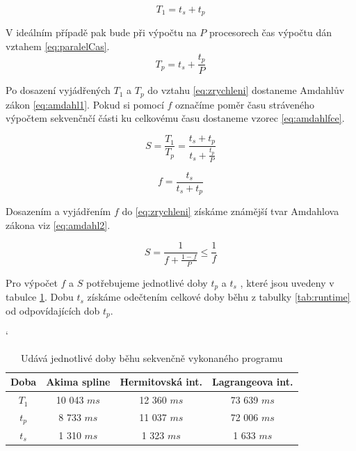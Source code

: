 \documentclass{article}
\begin{document}
	\begin{equation} 
	T_{1} = t_{s} + t_{p}   
	\label{eq:sekvencniSys}
	\end{equation}
	
	V ideálním případě pak bude při výpočtu na $P$ procesorech čas výpočtu dán vztahem \ref{eq:paralelCas}.
	\begin{equation} 
	T_{p} = t_{s} + \frac{t_{p}}{P}   
	\label{eq:paralelCas}
	\end{equation}
	
	Po dosazení vyjádřených $T_{1}$ a $T_{p}$ do vztahu \ref{eq:zrychleni} dostaneme Amdahlův zákon \ref{eq:amdahl1}. Pokud si pomocí $f$ označíme poměr času stráveného výpočtem sekvenčnčí části ku celkovému času dostaneme vzorec \ref{eq:amdahlfce}.
	
	\begin{equation} 
	S=\frac{T_{1}}{T_{p}} = \frac{t_{s} + t_{p} }{t_{s} + \frac{t_{p}}{P}}
	\label{eq:amdahl1}
	\end{equation}
	
	
	\begin{equation} 
	f = \frac{t_{s}}{t_{s} + t_{p}}
	\label{eq:amdahlfce}
	\end{equation}
	
	Dosazením a vyjádřením $f$ do \ref{eq:zrychleni} získáme známější tvar Amdahlova zákona viz \ref{eq:amdahl2}.
	
	\begin{equation} 
	S=\frac{1}{f + \frac{1-f}{P}} \leq  \frac{1}{f}
	\label{eq:amdahl2}
	\end{equation}
	
	Pro výpočet $f$ a $S$ potřebujeme jednotlivé doby $t_{p}$ a $t_{s}$ , které jsou uvedeny v tabulce \ref{tab:dobyBeh2}. Dobu $t_{s}$ získáme odečtením celkové doby běhu z tabulky \ref{tab:runtime} od odpovídajících dob $t_{p}$.
	
	
	\begin{table}[h]
	\centering
	\catcode`
	\def\arraystretch{1.2}
	\begin{tabular}{|c|c|c|c|}
	\hline
	\textbf{Doba}   & \textbf{Akima spline} & \textbf{Hermitovská int.} &  \textbf{Lagrangeova int.} \\ \hline
	\hline
	$T_{1}$    		  & 10 043 $m s$                  & 12 360 $m s$     		  &        73 639  $m s$                     \\ \hline
	$t_{p}$                  & 8 733 $m s$                  & 11 037 $m s$               &        72 006 $m s$                         \\ \hline
	$t_{s}$           		  & 1 310 $m s$                  & 1 323 $m s$                       & 1 633   $m s$          \\ \hline
	\end{tabular}
	\caption{Udává jednotlivé doby běhu sekvenčně vykonaného programu}
	\label{tab:dobyBeh2}
	\end{table}
	
\end{document}
